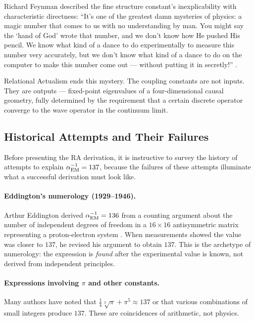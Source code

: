 \documentclass[12pt,a4paper]{article}
\begin{document}
Richard Feynman described the fine structure constant's inexplicability with characteristic directness: ``It's one of the greatest damn mysteries of physics: a magic number that comes to us with no understanding by man.  You might say the `hand of God' wrote that number, and we don't know how He pushed His pencil.  We know what kind of a dance to do experimentally to measure this number very accurately, but we don't know what kind of a dance to do on the computer to make this number come out --- without putting it in secretly!'' \cite{Feynman1985}.

Relational Actualism ends this mystery.  The coupling constants are not inputs.  They are outputs --- fixed-point eigenvalues of a four-dimensional causal geometry, fully determined by the requirement that a certain discrete operator converge to the wave operator in the continuum limit.

\subsection{Historical Attempts and Their Failures}

Before presenting the RA derivation, it is instructive to survey the history of attempts to explain $\alpha_{\rm EM}^{-1}=137$, because the failures of these attempts illuminate what a successful derivation must look like.

\paragraph{Eddington's numerology (1929--1946).}  Arthur Eddington derived $\alpha_{\rm EM}^{-1}=136$ from a counting argument about the number of independent degrees of freedom in a $16\times16$ antisymmetric matrix representing a proton-electron system \cite{Eddington1929}.  When measurements showed the value was closer to $137$, he revised his argument to obtain $137$.  This is the archetype of numerology: the expression is \emph{found} after the experimental value is known, not derived from independent principles.

\paragraph{Expressions involving $\pi$ and other constants.}  Many authors have noted that $\frac{1}{4}\sqrt[3]{\pi} + \pi^5\approx137$ or that various combinations of small integers produce $137$.  These are coincidences of arithmetic, not physics.
\end{document}

